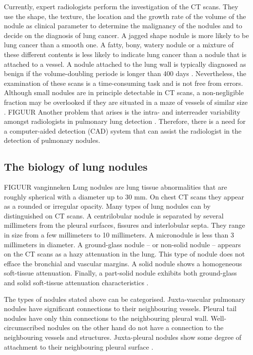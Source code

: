 Currently, expert radiologists perform the investigation of the
CT scans. They use the shape, the texture, the location and the growth rate of
the volume of the nodule as clinical parameter to determine the malignancy of
the nodules and to decide on the diagnosis of lung cancer. A jagged shape
nodule is more likely to be lung cancer than a smooth one. A fatty, bony,
watery nodule or a mixture of these different contents is less likely to
indicate lung cancer than a nodule that is attached to a vessel. A nodule
attached to the lung wall is typically diagnosed as benign if the
volume-doubling periode is longer than 400 days \cite{wu}. Nevertheless, the
examination of these scans is a time-consuming task and is not free from errors.
Although small nodules are in principle detectable in CT scans, a non-negligible
fraction may be overlooked if they are situated in a maze of vessels of similar size \cite{ozekes}.
FIGUUR
Another problem that arises is the intra- and interreader variability
amongst radiologists in pulmonary lung detection \cite{armato} \cite{hens}. Therefore,
there is a need for a computer-aided detection (CAD) system that can assist the
radiologist in the detection of pulmonary nodules.

\subsection{The biology of lung nodules}
FIGUUR vanginneken
Lung nodules are lung tissue abnormalities that are roughly spherical with a
diameter up to 30 mm. On chest CT scans they appear as a rounded or
irregular opacity. Many types of lung nodules can by distinguished on CT scans.
A centrilobular nodule is separated by several millimeters from the pleural
surfaces, fissures and interlobular septa. They range in size from a few
millimeters to 10 millimeters.
A micronodule is less than 3 millimeters in diameter. A ground-glass nodule --
or non-solid nodule -- appears on the CT scans as a hazy attenuation in the
lung. This type of nodule does not efface the bronchial and vascular margins. A solid
nodule shows a homogeneous soft-tissue attenuation. Finally, a part-solid nodule
exhibits both ground-glass and solid soft-tissue attenuation characteristics
\cite{nodule}. 

The types of nodules stated above can be categorised. Juxta-vascular
pulmonary nodules have significant connections to their neighbouring vessels.
Pleural tail nodules have only thin connections to the neighbouring pleural
wall. Well-circumscribed nodules on the other hand do not have a connection to
the neighbouring vessels and structures. Juxta-pleural nodules show some degree
of attachment to their neighbouring pleural surface \cite{kostis}.

